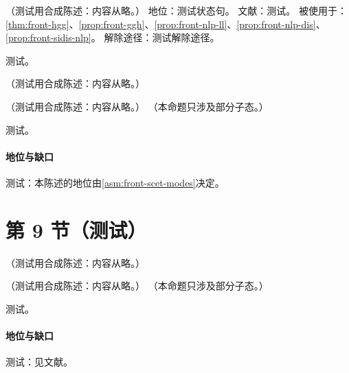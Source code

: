 \begin{assumption}\label{asm:front-scet-modes}
（测试用合成陈述：内容从略。）
地位：测试状态句。
文献：测试。
被使用于：\cref{thm:front-hgg}、\cref{prop:front-ggh}、\cref{prop:front-nlp-ll}、\cref{prop:front-nlp-dis}、\cref{prop:front-sidis-nlp}。
解除途径：测试解除途径。
\end{assumption}
\begin{proofsketch}测试。\end{proofsketch}

\begin{definition}[端点发散与重因子化条件]\label{def:front-endpoint}
（测试用合成陈述：内容从略。）
\end{definition}

\begin{theorem}\label{thm:front-hgg}
（测试用合成陈述：内容从略。）
（本命题只涉及部分子态。）
\end{theorem}
\begin{proofsketch}测试。\end{proofsketch}
\paragraph{地位与缺口}测试：本陈述的地位由\cref{asm:front-scet-modes}决定。

\section{第 9 节（测试）}\label{sec:front-positivity}

\begin{example}[领头双对数与 ${}_2F_2$]\label{ex:front-hgg-ldl}
（测试用合成陈述：内容从略。）
\end{example}

\begin{proposition}\label{prop:front-ggh}
（测试用合成陈述：内容从略。）
（本命题只涉及部分子态。）
\end{proposition}
\begin{proofsketch}测试。\end{proofsketch}
\paragraph{地位与缺口}测试：见文献。

